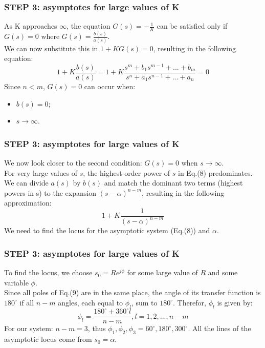 \begin{frame}
\frametitle{STEP 3: asymptotes for large values of K}
	As K approaches $\infty$, the equation $G(s) = -\frac{1}{K}$ can be satisfied only if $G(s) = 0$ where $G(s) = \frac{b(s)}{a(s)}$.\\
	\vspace{1em}
	We can now substitute this in $1 + KG(s) = 0$, resulting in the following equation:
	\begin{equation}
	1 + K\frac{b(s)}{a(s)} = 1 + K\frac{s^m + b_1s^{m-1} + ... + b_m}{s^n + a_1s^{n-1} + ... + a_n} = 0
	\end{equation}
	Since $n < m$, $G(s) = 0$ can occur when: 
	\begin{itemize}
		\item $b(s) = 0$;
		\item $s \rightarrow \infty$.
	\end{itemize}
\end{frame}

\begin{frame}
\frametitle{STEP 3: asymptotes for large values of K}
	We now look closer to the second condition: $G(s) = 0$ when $s \rightarrow \infty$.\\
	\vspace{1em}
	For very large values of $s$, the highest-order power of $s$ in Eq.(8) predominates. We can divide $a(s)$ by $b(s)$ and match the dominant two terms (highest powers in s) to the expansion $(s-\alpha)^{n-m}$, resulting in the following approximation:
	\begin{equation}
		1 + K\frac{1}{(s-\alpha)^{n-m}}
	\end{equation}
	We need to find the locus for the asymptotic system (Eq.(8)) and $\alpha$.
\end{frame}

\begin{frame}	
\frametitle{STEP 3: asymptotes for large values of K}
	To find the locus, we choose $s_0 = Re^{j\phi}$ for some large value of $R$ and some variable $\phi$.\\
	\vspace{1em}
	Since all poles of Eq.(9) are in the same place, the angle of its transfer function is $180^{\circ}$ if all $n-m$ angles, each equal to $\phi_l$, sum to $180^{\circ}$. Therefor, $\phi_l$ is given by: 
	\begin{equation}
	\phi_l = \frac{180^{\circ} + 360^{\circ}l}{n-m}, l = 1,2,...,n-m
	\end{equation}		For our system: $n-m=3$, thus $\phi_1, \phi_2, \phi_3 = 60^{\circ}, 180^{\circ}, 300^{\circ}$.
	All the lines of the asymptotic locus come from $s_0 = \alpha$.
\end{frame}

